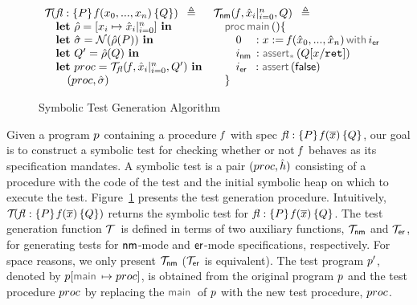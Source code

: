 \begin{figure}
{\footnotesize
$$
\begin{array}{lll}
\testify{}(\specsig{P}{\pid(\jvar_0, ..., \jvar_n)}{Q}{\flag}) \ \semeq                           &  \testify{\fnormal}(\pid, \svar_i|_{i=0}^n, Q) \ \semeq \\
%
\quad  \mathbf{let} \ \sstore =  [ \jvar_i \mapsto \svar_i|_{i=0}^n] \ \mathbf{in}        &  \quad \darkmath{\sf proc} \jsilmain () \{    \\
%
\quad  \mathbf{let} \ \sstate = \normaliser(\sstore(P)) \ \mathbf{in}                               &   \qquad 0_{\phantom{\sf nm}}: \jsilcall{\jvar}{\pid}{\svar_0, ..., \svar_n}{\errlab} \\
\quad  \mathbf{let} \ Q' = \sstore(Q) \ \mathbf{in}                                                           &  \qquad \retlab \, : \sepassert(Q[\jvar/\retvar])  \\
\quad  \mathbf{let} \ \proc = \testify{\flag}(\pid, \svar_i|_{i=0}^n, Q')  \ \mathbf{in}  &    \qquad \errlab \, \, \, : \jassert(\jfalse)   \\
\qquad (\proc, \sstate)                                                                                                 &  \quad \}  
\end{array}
$$}
\vspace*{-0.4cm}
\caption{Symbolic Test Generation Algorithm~\label{fig:test:generation}}
\vspace*{-0.2cm}
\end{figure}

Given a \jsil program $p$ containing a procedure $\mathit{f}$ with spec {\small ${\mathit{fl}} : \{ P \} \, \mathit{f}(\overline{x}) \, \{ Q \}$}, 
our goal is to construct a symbolic test for checking whether or not $\mathit{f}$ behaves as its specification mandates.
A symbolic test is a pair $(proc, \hat{h})$ consisting of a \jsil procedure with the code of the test and the initial 
symbolic heap on which to execute the test. 
%
Figure~\ref{fig:test:generation} presents the test generation procedure. Intuitively, $\mathcal{T}_{}({\mathit{fl}} : \{ P \} \, \mathit{f}(\overline{x}) \, \{ Q \})$ 
returns the symbolic test for ${\mathit{fl}} : \{ P \} \, \mathit{f}(\overline{x}) \, \{ Q \}$. The test generation function $\mathcal{T}_{} \ $ is defined in terms 
of two auxiliary functions, $\mathcal{T}_{{\sf nm}}$ and $\mathcal{T}_{{\sf er}}$, for generating tests for ${\sf nm}$-mode and 
${\sf er}$-mode specifications, respectively. 
For space reasons, we only present $\mathcal{T}_{{\sf nm}}$ ($\mathcal{T}_{{\sf er}}$ is equivalent). 
The test program $p'$, denoted by $\prog[\jsilmain \mapsto \proc]$, is obtained from the original program $p$ and the test procedure $proc$ by replacing the 
$\jsilmain$ of $p$ with the new test procedure, $proc$. 

